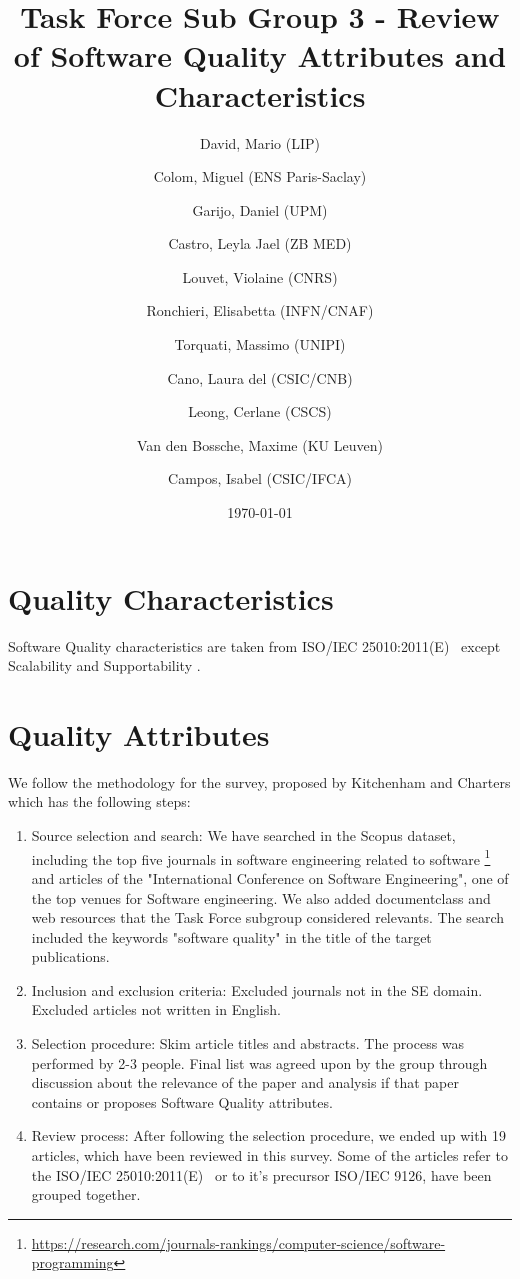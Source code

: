 \documentclass[a4paper]{article}
\title{Task Force Sub Group 3 - Review of Software Quality Attributes and Characteristics}
\author{
    David, Mario (LIP) \orcidlink{0000-0003-1802-5356} \and
    Colom, Miguel (ENS Paris-Saclay) \orcidlink{0000-0003-2636-0656} \and
    Garijo, Daniel (UPM) \orcidlink{0000-0003-0454-7145} \and
    Castro, Leyla Jael (ZB MED) \orcidlink{0000-0003-3986-0510} \and
    Louvet, Violaine (CNRS) \orcidlink{0000-0002-8742-8952} \and
    Ronchieri, Elisabetta (INFN/CNAF) \orcidlink{0000-0002-7341-6491} \and
    Torquati, Massimo (UNIPI) \orcidlink{0000-0001-6323-3459} \and
    Cano, Laura del (CSIC/CNB) \orcidlink{0000-0003-0981-2040} \and
    Leong, Cerlane (CSCS)  \orcidlink{0000-0001-8241-6277} \and
    Van den Bossche, Maxime (KU Leuven) \orcidlink{0000-0002-0938-0156} \and
    Campos, Isabel (CSIC/IFCA) \orcidlink{0000-0002-9350-0383}
}
\date{\today}
\begin{document}
\maketitle
\tableofcontents

\newpage
\section{Quality Characteristics}

Software Quality characteristics are taken from ISO/IEC 25010:2011(E)~\cite{iso_25010_2011_2017} except Scalability and
Supportability \cite{microsoft_2010}.



\newpage
\section{Quality Attributes}

We follow the methodology for the survey, proposed by Kitchenham and Charters \cite{keele2007guidelines} which has the following steps:

\begin{enumerate}
    \item Source selection and search: We have searched in the Scopus dataset, including the top five journals in
    software engineering related to software \footnote{\url{https://research.com/journals-rankings/computer-science/software-programming}}
    and articles of the  "International Conference on Software Engineering", one of the top venues for Software engineering. We also added documentclass
    and web resources that the Task Force subgroup considered relevants.
    The search included the keywords "software quality" in the title of the target publications.
    \item Inclusion and exclusion criteria: Excluded journals not in the SE domain. Excluded articles not written in English.
    \item Selection procedure: Skim article titles and abstracts. The process was performed by 2-3 people. Final list was agreed upon by the group through discussion
    about the relevance of the paper and analysis if that paper contains or proposes Software Quality attributes.
    \item Review process: After following the selection procedure, we ended up with 19 articles, which have been reviewed in this survey. Some of the articles
    refer to the ISO/IEC 25010:2011(E)~\cite{iso_25010_2011_2017} or to it's precursor ISO/IEC 9126, have been grouped together.
\end{enumerate}
\end{document}
